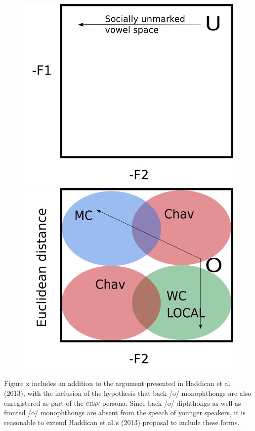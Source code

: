 \documentclass[PWPL]{article}
\begin{document}
\begin{figure}[ht]
\centering

\includegraphics[scale=0.25]{u_hypothesis_space.png}
\includegraphics[scale=0.25]{o_hypothesis_space.png}
\end{figure}

Figure x includes an addition to the argument presented in Haddican et al. (2013), with the inclusion of the hypothesis that back /o/ monophthongs are also enregistered as part of the \textsc{chav} persona. Since back /o/ diphthongs as well as fronted /o/ monophthongs are absent from the speech of younger speakers, it is reasonable to extend Haddican et al.`s (2013) proposal to include these forms. 
\end{document}
